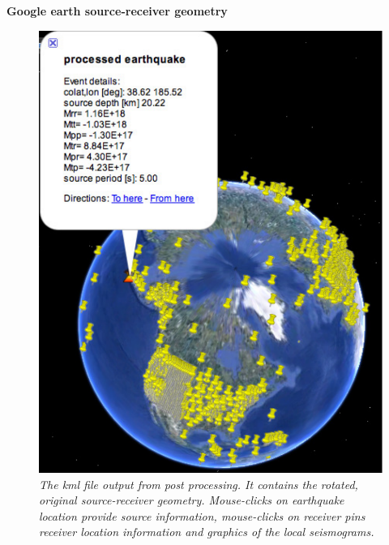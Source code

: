 \documentclass[11pt,letter,fleqn,english,notitlepage]{article}
\begin{document}
\noindent \textbf{Google earth source-receiver geometry}\\
\begin{figure}[htb]
    \begin{center}
        \includegraphics[scale=0.65]{googleearth_src_rec.pdf}
        \caption{\textit{The kml file output from post processing. It contains
        the rotated, original source-receiver geometry. Mouse-clicks on
        earthquake location provide source information, mouse-clicks on
        receiver pins receiver location information and graphics of the local
        seismograms.}}
    \end{center}
\end{figure}
\end{document}

